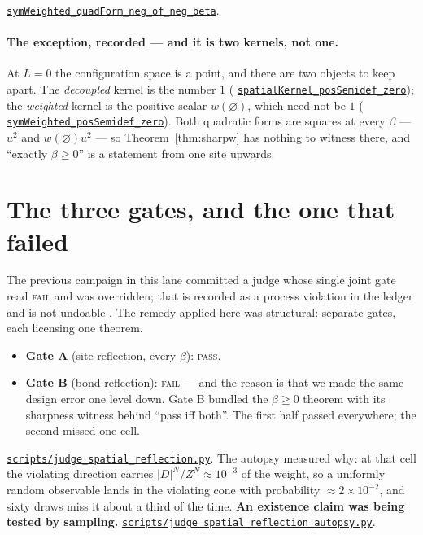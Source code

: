 \documentclass[11pt]{article}
\theoremstyle{definition}
\newcommand{\anchor}{854ff223396630a8a75b0a95a3ada6413f3a395d}
\newcommand{\osline}[3]{%
  \href{https://github.com/lluiseriksson/THE-ERIKSSON-PROGRAMME/blob/\anchor/YangMills/OS/#1.lean\#L#2}{\nolinkurl{#3}}}
\newcommand{\repofile}[2]{%
  \href{https://github.com/lluiseriksson/THE-ERIKSSON-PROGRAMME/blob/\anchor/#1}{\nolinkurl{#2}}}
\begin{document}
\osline{SpatialReflection}{365}{symWeighted\_quadForm\_neg\_of\_neg\_beta}.

\paragraph{The exception, recorded --- and it is two kernels, not one.}  At
$L=0$ the configuration space is a point, and there are two objects to keep
apart.  The \emph{decoupled} kernel is the number $1$
(\osline{SpatialReflection}{418}{spatialKernel\_posSemidef\_zero}); the
\emph{weighted} kernel is the positive scalar $w(\varnothing)$, which need not
be $1$
(\osline{SpatialReflection}{438}{symWeighted\_posSemidef\_zero}).  Both quadratic
forms are squares at every $\beta$ --- $u^2$ and $w(\varnothing)u^2$ --- so
Theorem~\ref{thm:sharpw} has nothing to witness there, and ``exactly
$\beta\ge0$'' is a statement from one site upwards.

\section{The three gates, and the one that failed}\label{sec:gates}

The previous campaign in this lane committed a judge whose single joint gate
read \textsc{fail} and was overridden; that is recorded as a process violation
in the ledger and is not undoable \cite{ErikssonUniform}.  The remedy applied
here was structural: separate gates, each licensing one theorem.

\begin{itemize}
\item \textbf{Gate A} (site reflection, every $\beta$): \textsc{pass}.
\item \textbf{Gate B} (bond reflection): \textsc{fail} --- and the reason is that
we made the same design error one level down.  Gate B bundled the $\beta\ge0$
theorem with its sharpness witness behind ``pass iff both''.  The first half
passed everywhere; the second missed one cell.
\end{itemize}

\repofile{scripts/judge\_spatial\_reflection.py}{scripts/judge\_spatial\_reflection.py}.
The autopsy measured why: at that cell the violating direction carries
$|D|^{N}/Z^{N} \approx 10^{-3}$ of the weight, so a uniformly random observable
lands in the violating cone with probability $\approx 2\times10^{-2}$, and sixty
draws miss it about a third of the time.  \textbf{An existence claim was being
tested by sampling.}
\repofile{scripts/judge\_spatial\_reflection\_autopsy.py}{scripts/judge\_spatial\_reflection\_autopsy.py}.
\end{document}
